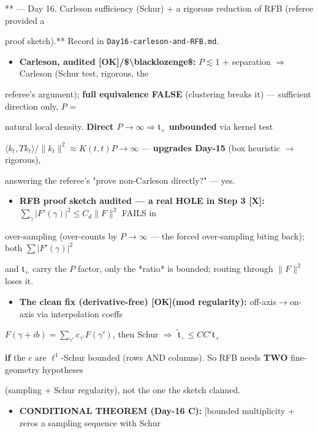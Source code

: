 \documentclass[10pt]{article}
\begin{document}
** --- Day 16. Carleson sufficiency (Schur) + a rigorous reduction of RFB (referee provided a\par
proof sketch).** Record in \texttt{Day16-carleson-and-RFB.md}.\par
\begin{itemize}
\item \textbf{Carleson, audited [OK]/\$\textbackslash{}blacklozenge\$:} $P\lesssim1$ + separation $\Rightarrow$ Carleson (Schur test, rigorous, the
\end{itemize}
  referee's argument); \textbf{full equivalence FALSE} (clustering breaks it) --- sufficient direction only, $P$ =\par
  natural local density. \textbf{Direct $P\to\infty\Rightarrow\mathfrak t_+$ unbounded} via kernel test\par
  $\langle k_t,Tk_t\rangle/\|k_t\|^2\approx K(t,t)P\to\infty$ --- \textbf{upgrades Day-15} (box heuristic \ensuremath{\to} rigorous),\par
  answering the referee's "prove non-Carleson directly?" --- yes.\par
\begin{itemize}
\item \textbf{RFB proof sketch audited --- a real HOLE in Step 3 [X]:} $\sum_\gamma|F'(\gamma)|^2\le C_d\|F\|^2$ FAILS in
\end{itemize}
  over-sampling (over-counts by $P\to\infty$ --- the forced over-sampling biting back); both $\sum|F'(\gamma)|^2$\par
  and $\mathfrak t_+$ carry the $P$ factor, only the *ratio* is bounded; routing through $\|F\|^2$ loses it.\par
\begin{itemize}
\item \textbf{The clean fix (derivative-free) [OK](mod regularity):} off-axis$\to$on-axis via interpolation coeffs
\end{itemize}
  $F(\gamma+ib)=\sum_{\gamma'}c_{\gamma'}F(\gamma')$, then Schur \ensuremath{\Rightarrow} $\widetilde{\mathfrak t}_-\le CC'\mathfrak t_+$\par
  \textbf{if} the $c$ are $\ell^1$-Schur bounded (rows AND columns). So RFB needs \textbf{TWO} fine-geometry hypotheses\par
  (sampling + Schur regularity), not the one the sketch claimed.\par
\begin{itemize}
\item \textbf{CONDITIONAL THEOREM (Day-16 C):} [bounded multiplicity + zeros a sampling sequence with Schur
\end{itemize}
\end{document}

